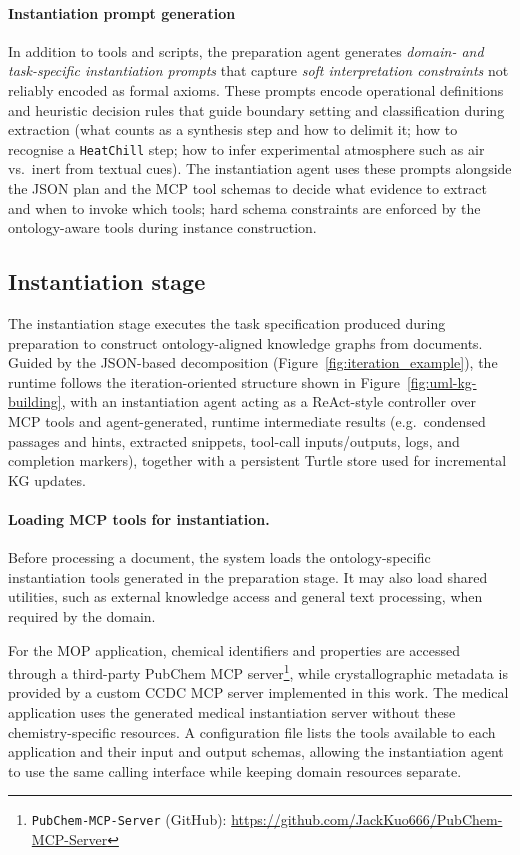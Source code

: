 \paragraph{Instantiation prompt generation}\label{sec:prep_prompt_gen}
In addition to tools and scripts, the preparation agent generates
\emph{domain- and task-specific instantiation prompts} that capture \emph{soft
interpretation constraints} not reliably encoded as formal axioms. These prompts
encode operational definitions and heuristic decision rules that guide boundary
setting and classification during extraction (\eg what counts as a synthesis
step and how to delimit it; how to recognise a \texttt{HeatChill} step; how to
infer experimental atmosphere such as air vs.\ inert from textual cues). The
instantiation agent uses these prompts alongside the JSON plan and the MCP tool
schemas to decide what evidence to extract and when to invoke which tools; hard
schema constraints are enforced by the ontology-aware tools during instance
construction.
 
\subsection{Instantiation stage}

The instantiation stage executes the task specification produced during
preparation to construct ontology-aligned knowledge graphs from documents.
Guided by the JSON-based decomposition (Figure~\ref{fig:iteration_example}),
the runtime follows the iteration-oriented structure shown in
Figure~\ref{fig:uml-kg-building}, with an instantiation agent acting as a
ReAct-style controller over MCP tools and agent-generated, runtime intermediate
results (e.g.\ condensed passages and hints, extracted snippets, tool-call
inputs/outputs, logs, and completion markers), together with a persistent
Turtle store used for incremental KG updates.

\paragraph{Loading MCP tools for instantiation.}
Before processing a document, the system loads the ontology-specific instantiation tools generated in the preparation stage. It may also load shared utilities, such as external knowledge access and general text processing, when required by the domain.

For the MOP application, chemical identifiers and properties are accessed through a third-party PubChem MCP server\footnote{\texttt{PubChem-MCP-Server} (GitHub): \url{https://github.com/JackKuo666/PubChem-MCP-Server}}, while crystallographic metadata is provided by a custom CCDC MCP server implemented in this work. The medical application uses the generated medical instantiation server without these chemistry-specific resources. A configuration file lists the tools available to each application and their input and output schemas, allowing the instantiation agent to use the same calling interface while keeping domain resources separate.


